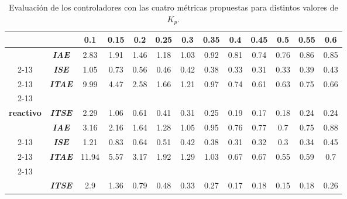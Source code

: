\begin{table}[H]
\centering
\begin{tabular}{|cc|c|c|c|c|c|c|c|c|c|c|c|}
\hline
\multicolumn{2}{|c|}{\textbf{}} & \textbf{0.1} & \textbf{0.15} & \textbf{0.2} & \textbf{0.25} & \textbf{0.3} & \textbf{0.35} & \textbf{0.4} & \textbf{0.45} & \textbf{0.5} & \textbf{0.55} & \textbf{0.6} \\ \hline

\multicolumn{1}{|c|}{} & \textbf{\textit{IAE}}  & 2.83 & 1.91 & 1.46 & 1.18 & 1.03 & 0.92 & 0.81 & 0.74 & 0.76 & 0.86 & 0.85 \\ \cline{2-13} 
\multicolumn{1}{|c|}{} & \textbf{\textit{ISE}}  & 1.05 & 0.73 & 0.56 & 0.46 & 0.42 & 0.38 & 0.33 & 0.31 & 0.33 & 0.39 & 0.43 \\ \cline{2-13} 
\multicolumn{1}{|c|}{} & \textbf{\textit{ITAE}} & 9.99 & 4.47 & 2.58 & 1.66 & 1.21 & 0.97 & 0.74 & 0.61 & 0.63 & 0.75 & 0.66 \\ \cline{2-13} 
\multicolumn{1}{|c|}{\multirow{-4}{*}{\shortstack{\textbf{Cont. prop.}\\\textbf{reactivo}}}} & \textbf{\textit{ITSE}} & 2.29 & 1.06 & 0.61 & 0.41 & 0.31 & 0.25 & 0.19 & 0.17 & 0.18 & 0.24 & 0.24 \\ \hline

\multicolumn{1}{|c|}{} & \textbf{\textit{IAE}}  & 3.16 & 2.16 & 1.64 & 1.28 & 1.05 & 0.95 & 0.76 & 0.77 & \cellcolor[HTML]{FFFE65}0.7  & 0.75 & 0.88 \\ \cline{2-13} 
\multicolumn{1}{|c|}{} & \textbf{\textit{ISE}}  & 1.21 & 0.83 & 0.64 & 0.51 & 0.42 & 0.38 & 0.31 & 0.32 & \cellcolor[HTML]{FFFE65}0.3  & 0.34 & 0.45 \\ \cline{2-13} 
\multicolumn{1}{|c|}{} & \textbf{\textit{ITAE}} & 11.94 & 5.57 & 3.17 & 1.92 & 1.29 & 1.03 & 0.67 & 0.67 & \cellcolor[HTML]{FFFE65}0.55 & 0.59 & 0.7 \\ \cline{2-13} 
\multicolumn{1}{|c|}{\multirow{-4}{*}{\shortstack{\textbf{Cont. geom.}\\\textbf{}}}} & \textbf{\textit{ITSE}} & 2.9 & 1.36 & 0.79 & 0.48 & 0.33 & 0.27 & 0.17 & 0.18 & \cellcolor[HTML]{FFFE65}0.15 & 0.18 & 0.26 \\ \hline
\end{tabular}
\caption{Evaluación de los controladores con las cuatro métricas propuestas para 
distintos valores de $K_p$.}
\label{tab:controladores_desempeno}
\end{table}

